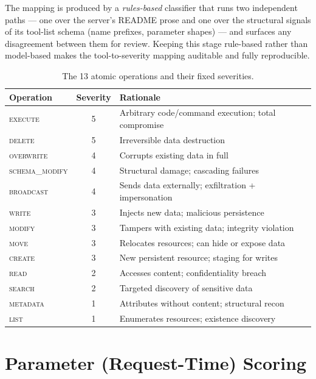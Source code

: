The mapping is produced by a \emph{rules-based} classifier that runs two
independent paths --- one over the server's README prose and one over the
structural signals of its tool-list schema (name prefixes, parameter shapes) ---
and surfaces any disagreement between them for review. Keeping this stage
rule-based rather than model-based makes the tool-to-severity mapping auditable
and fully reproducible.

\begin{table}[H]
    \centering
    \caption{The 13 atomic operations and their fixed severities.}
    \label{tab:atomic}
    \begin{tabular}{l c l}
        \hline
        \textbf{Operation} & \textbf{Severity} & \textbf{Rationale} \\
        \hline
        \textsc{execute}       & 5 & Arbitrary code/command execution; total compromise \\
        \textsc{delete}        & 5 & Irreversible data destruction \\
        \textsc{overwrite}     & 4 & Corrupts existing data in full \\
        \textsc{schema\_modify} & 4 & Structural damage; cascading failures \\
        \textsc{broadcast}     & 4 & Sends data externally; exfiltration + impersonation \\
        \textsc{write}         & 3 & Injects new data; malicious persistence \\
        \textsc{modify}        & 3 & Tampers with existing data; integrity violation \\
        \textsc{move}          & 3 & Relocates resources; can hide or expose data \\
        \textsc{create}        & 3 & New persistent resource; staging for writes \\
        \textsc{read}          & 2 & Accesses content; confidentiality breach \\
        \textsc{search}        & 2 & Targeted discovery of sensitive data \\
        \textsc{metadata}      & 1 & Attributes without content; structural recon \\
        \textsc{list}          & 1 & Enumerates resources; existence discovery \\
        \hline
    \end{tabular}
\end{table}

\section{Parameter (Request-Time) Scoring}
\label{sec:framework:params}

